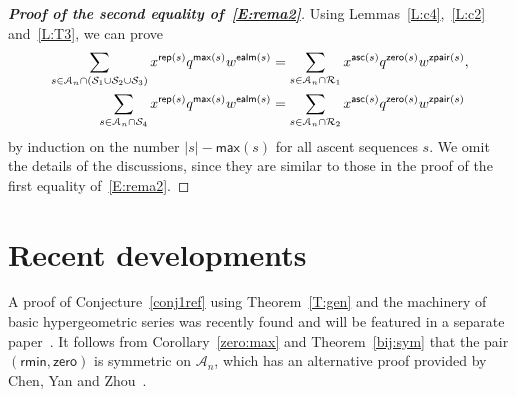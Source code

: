 \documentclass[12pt]{amsart}
\theoremstyle{plain}
\theoremstyle{definition}
\theoremstyle{example}
\theoremstyle{remark}
\numberwithin{equation}{section}
\numberwithin{figure}{section}
\newcommand{\asc}{\mathsf{asc}}
\def\max{\mathsf{max}}
\def\zero{\mathsf{zero}}
\def\rep{\mathsf{rep}}
\def\rmin{\mathsf{rmin}}
\def\ealm{\mathsf{ealm}}
\def\A{\mathcal{A}}
\begin{document}
\begin{proof}[{\bf Proof of the second equality of~\eqref{E:rema2}}]
Using Lemmas~\ref{L:c4},~\ref{L:c2} and~\ref{L:T3}, we
 can prove 
\begin{align*}
\sum_{s\in\A_n\cap(\CMcal{S}_1\cup\CMcal{S}_2\cup\CMcal{S}_3)}
x^{\rep(s)}q^{\max(s)}w^{\ealm(s)}
&=\sum_{s\in\A_n\cap\CMcal{R}_1}
x^{\asc(s)}q^{\zero(s)}w^{\mathsf{zpair}(s)},\\
\sum_{s\in\A_n\cap\CMcal{S}_4}
x^{\rep(s)}q^{\max(s)}w^{\ealm(s)}
&=\sum_{s\in\A_n\cap\CMcal{R}_2}
x^{\asc(s)}q^{\zero(s)}w^{\mathsf{zpair}(s)}
\end{align*}
by induction on the number $|s|-\max(s)$ for all ascent sequences $s$.  We omit the details of the discussions, since they are similar to those in the proof of the first equality of~\eqref{E:rema2}.
\end{proof}






















































\section*{Recent developments} 


 
 A proof of Conjecture~\ref{conj1ref}  using Theorem~\ref{T:gen}  and the machinery
of basic hypergeometric series was recently found and will be featured in a separate paper~\cite{js}. It follows from Corollary~\ref{zero:max} and Theorem~\ref{bij:sym} that the pair $(\rmin,\zero)$ is symmetric on $\A_n$, which has an alternative proof provided by Chen, Yan and Zhou~\cite{cyz}.
\end{document}

